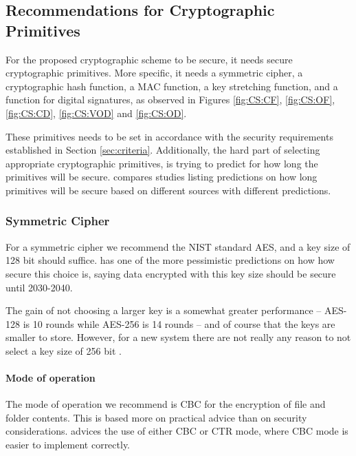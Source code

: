\documentclass[pdftex,english,10pt,b5paper,twoside]{book}
\begin{document}
\subsection{Recommendations for Cryptographic Primitives}
\label{sec:cryptoprimitivechoice}

For the proposed cryptographic scheme to be secure, it needs secure
cryptographic primitives. More specific, it needs a symmetric cipher, a
cryptographic hash function, a \ac{MAC} function, a key stretching function,
and a function for digital signatures, as observed in Figures \ref{fig:CS:CF},
\ref{fig:CS:OF}, \ref{fig:CS:CD}, \ref{fig:CS:VOD} and \ref{fig:CS:OD}.

These primitives needs to be set in accordance with the security requirements
established in Section \ref{sec:criteria}. Additionally, the hard part of
selecting appropriate cryptographic primitives, is trying to predict for how
long the primitives will be secure. \citet{keylength} compares studies listing
predictions on how long primitives will be secure based on different sources
with different predictions.

\subsubsection{Symmetric Cipher}

For a symmetric cipher we recommend the \ac{NIST} standard \ac{AES}, and a key
size of 128 bit should suffice.  \cite{ecrypt2_2010}
has one of the more pessimistic predictions on how how secure this choice is,
saying data encrypted with this key size should be secure until 2030-2040. 

The gain of not choosing a larger key is a somewhat greater performance --
\ac{AES}-128 is 10 rounds while \ac{AES}-256 is 14 rounds -- and of course that
the keys are smaller to store. However, for a new system there are not really
any reason to not select a key size of 256 bit \cite{schneier}.

\paragraph{Mode of operation} The mode of operation we recommend is \ac{CBC}
for the encryption of file and folder contents.  This is based more on
practical advice than on security considerations.  \citet{schneier} advices the
use of either \ac{CBC} or \ac{CTR} mode, where \ac{CBC} mode is easier to
implement correctly. 
\end{document}
